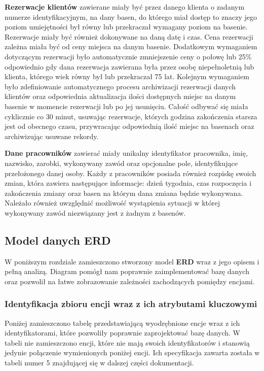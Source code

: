 \documentclass[a4paper]{article}
\begin{document}
\textbf{Rezerwacje klientów} zawierane miały być przez danego klienta o zadanym numerze identyfikacyjnym, na dany basen, do którego miał dostęp to znaczy jego poziom umiejętności był równy lub przekraczał wymagany poziom na basenie. Rezerwacje miały być również dokonywane na daną datę i czas. Cena rezerwacji zależna miała być od ceny miejsca na danym basenie. Dodatkowym wymaganiem dotyczącym rezerwacji było automatycznie zmniejszenie ceny o połowę lub 25\% odpowiednio gdy dana rezerwacja zawierana była przez osobę niepełnoletnią lub klienta, którego wiek równy był lub przekraczał 75 lat. Kolejnym wymaganiem było zdefiniowanie automatycznego procesu archiwizacji rezerwacji danych klientów oraz odpowiednia aktualizacja ilości dostępnych miejsc na danym basenie w momencie rezerwacji lub po jej usunięciu. Całość odbywać się miała cyklicznie co 30 minut, usuwając rezerwacje, których godzina zakończenia starsza jest od obecnego czasu, przywracając odpowiednią ilość miejsc na basenach oraz archiwizując usuwane rekordy.

\textbf{Dane pracowników} zawierać miały unikalny identyfikator pracownika, imię, nazwisko, zarobki, wykonywany zawód oraz opcjonalne pole, identyfikujące przełożonego danej osoby. Każdy z pracowników posiada również rozpiskę swoich zmian, która zawiera następujące informacje: dzień tygodnia, czas rozpoczęcia i zakończenia zmiany oraz basen na którym dana zmiana będzie wykonywana. Należało również uwzględnić możliwość wystąpienia sytuacji w której wykonywany zawód niezwiązany jest z żadnym z basenów.

\subsection{Model danych \textbf{ERD}}

W poniższym rozdziale zamieszczono stworzony model \textbf{ERD} wraz z jego opisem i pełną analizą. Diagram pomógł nam poprawnie zaimplementować bazę danych oraz pozwolił na łatwe zobrazowanie zależności zachodzących pomiędzy encjami.

\subsubsection{Identyfikacja zbioru encji wraz z ich atrybutami kluczowymi}

Poniżej zamieszczono tabelę przedstawiającą wyodrębnione encje wraz z ich identyfikatorami, które pozwoliły poprawnie zaprojektować bazę danych. W tabeli nie zamieszczono encji, które nie mają swoich identyfikatorów i stanowią jedynie połączenie wymienionych poniżej encji. Ich specyfikacja zawarta została w tabeli numer 5 znajdującej się w dalszej części dokumentacji.
\end{document}
